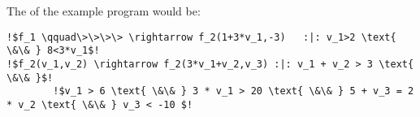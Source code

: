 \begin{frame}[fragile]
	\begin{example}
		The \its of the example program would be: \newline
		\begin{lstlisting}[linewidth=10.5cm, escapechar = !]
!$f_1 \qquad\>\>\>\> \rightarrow f_2(1+3*v_1,-3)   :|: v_1>2 \text{ \&\& } 8<3*v_1$!
!$f_2(v_1,v_2) \rightarrow f_2(3*v_1+v_2,v_3) :|: v_1 + v_2 > 3 \text{ \&\& }$! 
		!$v_1 > 6 \text{ \&\& } 3 * v_1 > 20 \text{ \&\& } 5 + v_3 = 2 * v_2 \text{ \&\& } v_3 < -10 $!
		\end{lstlisting}
	\end{example}
\end{frame}